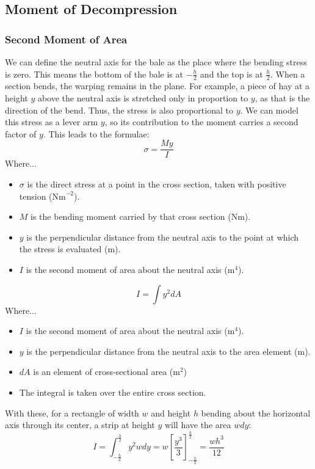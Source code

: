 \subsection{Moment of Decompression}
\subsubsection{Second Moment of Area}
We can define the neutral axis for the bale as the place where the bending stress is zero. This means the bottom of the bale is at $-\frac{h}{2}$ and the top is at $\frac{h}{2}$. When a section bends, the warping remains in the plane. For example, a piece of hay at a height $y$ above the neutral axis is stretched only in proportion to $y$, as that is the direction of the bend. Thus, the stress is also proportional to $y$. We can model this stress as a lever arm $y$, so its contribution to the moment carries a second factor of $y$. This leads to the formulae:
\[
\sigma=\frac{My}{I}
\]
Where...
\begin{itemize}
	\item $\sigma$ is the direct stress at a point in the cross section, taken with positive tension ($\text{Nm}^{-2}$).
	\item $M$ is the bending moment carried by that cross section (Nm).
	\item $y$ is the perpendicular distance from the neutral axis to the point at which the stress is evaluated (m).
	\item $I$ is the second moment of area about the neutral axis ($\text{m}^4$).
\end{itemize}
\[
I=\int y^2dA
\]
Where...
\begin{itemize}
	\item $I$ is the second moment of area about the neutral axis ($\text{m}^4$).
	\item $y$ is the perpendicular distance from the neutral axis to the area element (m).
	\item $dA$ is an element of cross-sectional area ($\text{m}^2$)
	\item The integral is taken over the entire cross section.
\end{itemize}

With these, for a rectangle of width $w$ and height $h$ bending about the horizontal axis through its center, a strip at height $y$ will have the area $wdy$:
\[
I=\int_{-\frac{h}{2}}^{\frac{h}{2}}y^2wdy=w\left[\frac{y^3}{3}\right]^{\frac{h}{2}}_{-\frac{h}{2}}=\frac{wh^3}{12}
\]


